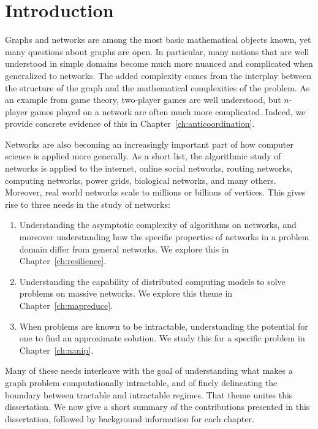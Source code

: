 \chapter{Introduction}
\label{introduction}

Graphs and networks are among the most basic mathematical objects known, yet
many questions about graphs are open. In particular, many notions that are well
understood in simple domains become much more nuanced and complicated when
generalized to networks. The added complexity comes from the interplay between
the structure of the graph and the mathematical complexities of the problem. As
an example from game theory, two-player games are well understood, but
$n$-player games played on a network are often much more complicated. Indeed,
we provide concrete evidence of this in Chapter~\ref{ch:anticoordination}. 

Networks are also becoming an increasingly important part of how computer
science is applied more generally. As a short list, the algorithmic study of
networks is applied to the internet, online social networks, routing networks,
computing networks, power grids, biological networks, and many others.
Moreover, real world networks scale to millions or billions of vertices. This
gives rise to three needs in the study of networks:

\begin{enumerate}
\item Understanding the asymptotic complexity of algorithms on networks, and
moreover understanding how the specific properties of networks in a problem
domain differ from general networks. We explore this in
Chapter~\ref{ch:resilience}.
\item Understanding the capability of distributed computing models to solve
problems on massive networks. We explore this theme in
Chapter~\ref{ch:mapreduce}.  
\item When problems are known to be intractable, understanding the potential
for one to find an approximate solution. We study this for a specific problem
in Chapter~\ref{ch:nanip}.
\end{enumerate}

Many of these needs interleave with the goal of understanding what makes a
graph problem computationally intractable, and of finely delineating the
boundary between tractable and intractable regimes. That theme unites this
dissertation.  We now give a short summary of the contributions presented in
this dissertation, followed by background information for each chapter.

